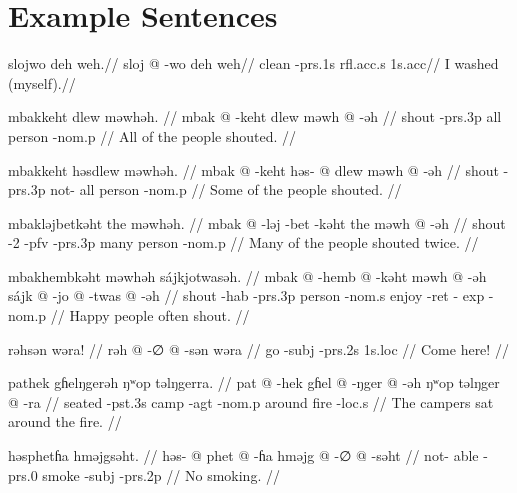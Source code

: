 \section{Example Sentences}

\ex
\begingl
\glpreamble slojwo deh weh.//
\gla sloj @ -wo deh weh//
\glb clean -{\sc prs}.1s {\sc rfl}.{\sc acc}.s 1s.{\sc acc}//
\glft I washed (myself).//
\endgl
\xe

\pex
\a
\begingl
\glpreamble mbakkeht dlew məwhəh. //
\gla mbak @ -keht dlew məwh @ -əh //
\glb shout -{\sc prs}.3p all person -{\sc nom}.p //
\glft All of the people shouted. //
\endgl

\a
\begingl
\glpreamble mbakkeht həsdlew məwhəh. //
\gla mbak @ -keht həs- @ dlew məwh @ -əh //
\glb shout -{\sc prs}.3p not- all person -{\sc nom}.p //
\glft Some of the people shouted. //
\endgl

\a
\begingl
\glpreamble mbakləjbetkəht the məwhəh. //
\gla mbak @ -ləj -bet -kəht the məwh @ -əh //
\glb shout -2 -{\sc pfv} -{\sc prs}.3p many person -{\sc nom}.p //
\glft Many of the people shouted twice. //
\endgl

\a
\begingl
\glpreamble mbakhembkəht məwhəh sájkjotwasəh. //
\gla mbak @ -hemb @ -kəht məwh @ -əh sájk @ -jo @ -twas @ -əh //
\glb shout -{\sc hab} -{\sc prs}.3p person -{\sc nom}.s enjoy -{\sc ret} -{\sc
exp} -{\sc nom}.p //
\glft Happy people often shout. //
\endgl
\xe

\ex
\begingl
\glpreamble rəhsən wəra! //
\gla rəh @ -∅ @ -sən wəra //
\glb go -{\sc subj} -{\sc prs}.2s 1s.{\sc loc} //
\glft Come here! //
\endgl
\xe

\ex
\begingl
\glpreamble pathek gɦelŋgerəh ŋʷop təlŋgerra. //
\gla pat @ -hek gɦel @ -ŋger @ -əh ŋʷop təlŋger @ -ra //
\glb seated -{\sc pst}.3s camp -{\sc agt} -{\sc nom}.p around fire -{\sc loc}.s
//
\glft The campers sat around the fire. //
\endgl
\xe

\ex
\begingl
    \glpreamble həsphetɦa hməjgsəht. //
    \gla həs- @ phet @ -ɦa hməjg @ -∅ @ -səht //
    \glb not- able -{\sc prs}.0 smoke -{\sc subj} -{\sc prs}.2p //
    \glft No smoking. //
\endgl
\xe

